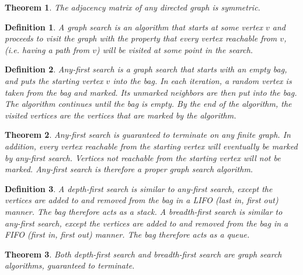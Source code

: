 \documentclass[a4paper]{article}
\newtheorem{mytheorem}{Theorem}
\newtheorem{mydef}{Definition}
\numberwithin{mytheorem}{section}
\numberwithin{mydef}{section}
\numberwithin{example}{section}
\begin{document}
\begin{mytheorem} The adjacency matrix of any directed graph is symmetric.
\end{mytheorem}

\begin{mydef} A graph search is an algorithm that starts at some vertex $v$ and proceeds to visit the graph with the property that every vertex reachable from $v$, (i.e. having a path from $v$) will be visited at some point in the search.  
\end{mydef}

\begin{mydef} Any-first search is a graph search that starts with an empty bag, and puts the starting vertex $v$ into the bag. In each iteration, a random vertex is taken from the bag and marked. Its unmarked neighbors are then put into the bag. The algorithm continues until the bag is empty. By the end of the algorithm, the visited vertices are the vertices that are marked by the algorithm.
\end{mydef}

\begin{mytheorem} Any-first search is guaranteed to terminate on any finite graph. In addition, every vertex reachable from the starting vertex will eventually be marked by any-first search. Vertices not reachable from the starting vertex will not be marked. Any-first search is therefore a proper graph search algorithm. 
\end{mytheorem}

\begin{mydef} A depth-first search is similar to any-first search, except the vertices are added to and removed from the bag in a LIFO (last in, first out) manner. The bag therefore acts as a stack. A breadth-first search is similar to any-first search, except the vertices are added to and removed from the bag in a FIFO (first in, first out) manner. The bag therefore acts as a queue.
\end{mydef}

\begin{mytheorem} Both depth-first search and breadth-first search are graph search algorithms, guaranteed to terminate. 
\end{mytheorem}
\end{document}

